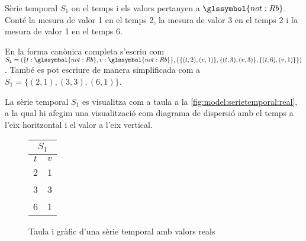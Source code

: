 \begin{example}
  Sèrie temporal $S_1$ on el temps i els valors pertanyen a
  $\glssymbol{not:Rb}$. Conté la mesura de valor 1 en el temps 2, la mesura de
  valor 3 en el temps 2 i la mesura de valor 1 en el temps 6.

En la forma canònica completa s'escriu com $S_1 = ( \{t:
\glssymbol{not:Rb}, v: \glssymbol{not:Rb}\}, \{ \{(t,2),(v,1)\}, \{(t,3),(v,3)\},
\{(t,6),(v,1)\} \} )$. També es pot escriure de manera simplificada com a
$S_1 = \{ (2,1), (3,3), (6,1) \}$.


La sèrie temporal $S_1$ es visualitza com a taula a la
\autoref{fig:model:serietemporal:real}, a la qual hi afegim una
visualització com diagrama de dispersió amb el temps a l'eix
horitzontal i el valor a l'eix vertical.

\begin{figure}[tp]
  \centering
  \begin{tabular}[c]{|c|c|}
    \multicolumn{2}{c}{$S_1$} \\ \hline
    $t$  & $v$ \\ \hline
    2  & 1 \\
    3  & 3 \\
    6  & 1 \\ \hline
  \end{tabular} \qquad
  \caption{Taula i gràfic d'una sèrie temporal amb valors reals}
  \label{fig:model:serietemporal:real}
\end{figure}
 
\end{example}


